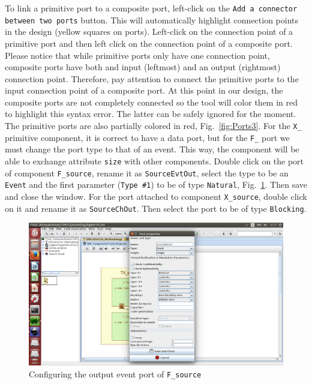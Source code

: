 \documentclass{llncs}
\newcommand{\screenshotsize}{1.0\textwidth}
\begin{document}
%
To link a primitive port to a composite port, left-click on the \texttt{Add a connector between two ports} button. This
will automatically highlight connection points in the design (yellow squares on ports). Left-click on the connection
point of a primitive port and then left click on the connection point of a composite port. Please notice that while
primitive ports only have one connection point, composite ports have both and input (leftmost) and an output (rightmost)
connection point. Therefore, pay attention to connect the primitive ports to the input connection point of a composite port. At
this point in our design, the composite ports are not completely connected so the tool will color them in red to
highlight this syntax error. The latter can be safely ignored for the moment. The primitive ports are also
partially colored in red, Fig.~\ref{fig:Ports3}. For the \texttt{X\_} primitive component, it is correct to have a data
port, but for the \texttt{F\_} port we must change the port type to that of an event. This way, the component will be
able to exchange attribute \texttt{size} with other components. Double click on the port of component
\texttt{F\_source}, rename it as \texttt{SourceEvtOut}, select the type to be an \texttt{Event} and the first
parameter (\texttt{Type \#1}) to be of type \texttt{Natural}, Fig.~\ref{fig:Ports4_5}. Then save and close the window.
For the port attached to component \texttt{X\_source}, double click on it and rename it as \texttt{SourceChOut}. Then
select the port to be of type \texttt{Blocking}.\\
%
\begin{figure}[!htbp]
	\centering
	\includegraphics[width=\screenshotsize]{figures/screenshot/Ports4_5.png}
	\caption{Configuring the output event port of \texttt{F\_source}}
	\label{fig:Ports4_5}
\end{figure}
\end{document}
